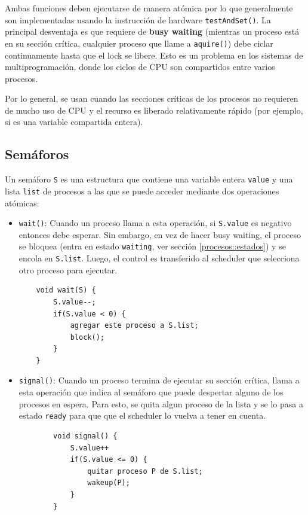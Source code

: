 Ambas funciones deben ejecutarse de manera atómica por lo que generalmente son implementadas usando la instrucción de hardware \texttt{testAndSet()}. La principal desventaja es que requiere de \textbf{busy waiting} (mientras un proceso está en su sección crítica, cualquier proceso que llame a \texttt{aquire()}) debe ciclar continuamente hasta que el lock se libere. Esto es un problema en los sistemas de multiprogramación, donde los ciclos de CPU son compartidos entre varios procesos.

Por lo general, se usan cuando las secciones críticas de los procesos no requieren de mucho uso de CPU y el recurso es liberado relativamente rápido (por ejemplo, si es una variable compartida entera).

\subsection{Semáforos}
Un semáforo \texttt{S} es una estructura que contiene una variable entera \texttt{value} y una lista \texttt{list} de procesos a las que se puede acceder mediante dos operaciones atómicas:
\begin{itemize}
    \item \texttt{wait()}: Cuando un proceso llama a esta operación, si \texttt{S.value} es negativo entonces debe esperar. Sin embargo, en vez de hacer busy waiting, el proceso se bloquea (entra en estado \texttt{waiting}, ver sección \ref{procesos::estados}) y se encola en \texttt{S.list}. Luego, el control es transferido al scheduler que selecciona otro proceso para ejecutar.
\begin{verbatim}
    void wait(S) {
        S.value--;
        if(S.value < 0) {
            agregar este proceso a S.list;
            block();
        }
    }
\end{verbatim}
    \item \texttt{signal()}: Cuando un proceso termina de ejecutar su sección crítica, llama a esta operación que indica al semáforo que puede despertar alguno de los procesos en espera. Para esto, se quita algun proceso de la lista y se lo pasa a estado \texttt{ready} para que que el scheduler lo vuelva a tener en cuenta.
    \begin{verbatim}
        void signal() {
            S.value++
            if(S.value <= 0) {
                quitar proceso P de S.list;
                wakeup(P);
            }	
        }
    \end{verbatim}
\end{itemize}

